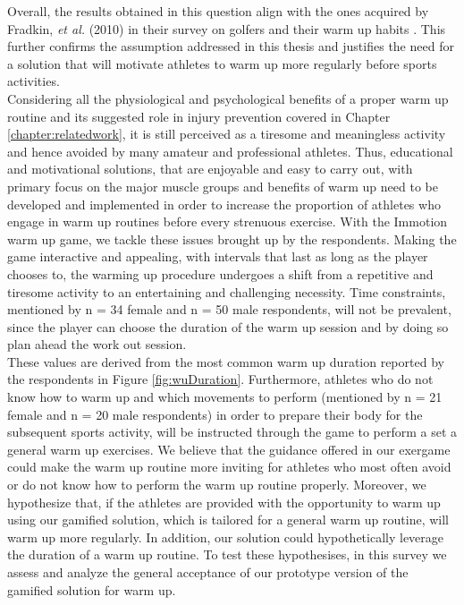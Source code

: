 Overall, the results obtained in this question align with the ones acquired by Fradkin, \textit{et al.} (2010) in their survey on golfers and their warm up habits \cite{fradkin2010effects}. This further confirms the assumption addressed in this thesis and justifies the need for a solution that will motivate athletes to warm up more regularly before sports activities. \\Considering all the physiological and psychological benefits of a proper warm up routine and its suggested role in injury prevention covered in Chapter \ref{chapter:relatedwork}, it is still perceived as a tiresome and meaningless activity and hence avoided by many amateur and professional athletes. Thus, educational and motivational solutions, that are enjoyable and easy to carry out, with primary focus on the major muscle groups and benefits of warm up need to be developed and implemented in order to increase the proportion of athletes who engage in warm up routines before every strenuous exercise. With the Immotion warm up game, we tackle these issues brought up by the respondents. Making the game interactive and appealing, with intervals that last as long as the player chooses to, the warming up procedure undergoes a shift from a repetitive and tiresome activity to an entertaining and challenging necessity. Time constraints, mentioned by n = 34 female and n = 50 male respondents, will not be prevalent, since the player can choose the duration of the warm up session and by doing so plan ahead the work out session.\\ These values are derived from the most common warm up duration reported by the respondents in Figure \ref{fig:wuDuration}. Furthermore, athletes who do not know how to warm up and which movements to perform (mentioned by n = 21 female and n = 20 male respondents) in order to prepare their body for the subsequent sports activity, will be instructed through the game to perform a set a general warm up exercises. We believe that the guidance offered in our exergame could make the warm up routine more inviting for athletes who most often avoid or do not know how to perform the warm up routine properly. Moreover, we hypothesize that, if the athletes are provided with the opportunity to warm up using our gamified solution, which is tailored for a general warm up routine, will warm up more regularly. In addition, our solution could hypothetically leverage the duration of a warm up routine. To test these hypothesises, in this survey we assess and analyze the general acceptance of our prototype version of the gamified solution for warm up. 
